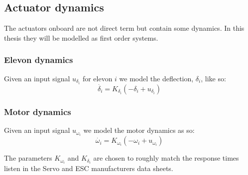 \subsection{Actuator dynamics}
The actuators onboard are not direct term but contain some dynamics.
In this thesis they will be modelled as first order systems.
\subsubsection{Elevon dynamics}
Given an input signal $u_{\delta_i}$ for elevon $i$ we model the deflection, $\delta_i$, like so:
\begin{equation}
    \dot{\delta_i} = K_{\delta_i} (-\delta_i + u_{\delta_i})
\end{equation}

\subsubsection{Motor dynamics}
Given an input signal $u_{\omega_i}$ we model the motor dynamics as so:
\begin{equation}
    \dot{\omega_i} =  K_{\omega_i}(-\omega_i + u_{\omega_i})
\end{equation}

The parameters $K_{\omega_i}$ and $K_{\delta_i}$ are chosen to roughly match the response times listen in the Servo and ESC manufacturers data sheets.
